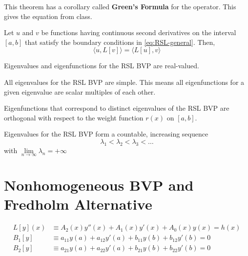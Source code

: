 This theorem has a corollary called \textbf{Green's Formula} for the operator. This gives the equation from class.

\begin{theorem}
Let $u$ and $v$ be functions having continuous second derivatives on the interval $[a,b]$ that satisfy the boundary conditions in \ref{eq:RSL-general}. Then,
\begin{equation}
    \langle u, L[v] \rangle = \langle L[u], v \rangle
\end{equation}
\end{theorem}

\begin{theorem}
Eigenvalues and eigenfunctions for the RSL BVP are real-valued.
\end{theorem}

\begin{theorem}
All eigenvalues for the RSL BVP are simple. This means all eigenfunctions for a given eigenvalue are scalar multiples of each other.
\end{theorem}

\begin{theorem}
Eigenfunctions that correspond to distinct eigenvalues of the RSL BVP are orthogonal with respect to the weight function $r(x)$ on $[a,b]$.
\end{theorem}

\begin{theorem}
Eigenvalues for the RSL BVP form a countable, increasing sequence
\begin{equation*}
    \lambda_1 < \lambda_2 < \lambda_3 < \dots
\end{equation*}
with $\lim\limits_{n \to \infty} \lambda_n = +\infty$
\end{theorem}



\section{Nonhomogeneous BVP and Fredholm Alternative}
\begin{align}
    L[y](x) & \equiv A_2(x)y''(x) + A_1(x)y'(x) + A_0(x)y(x) = h(x) \label{eq:diff-operator-nonhomo}\\
    B_1[y] & \equiv a_{11}y(a) + a_{12}y'(a) + b_{11}y(b) + b_{12}y'(b) = 0 \\
    B_2[y] & \equiv a_{21}y(a) + a_{22}y'(a) + b_{21}y(b) + b_{22}y'(b) = 0
\end{align}

